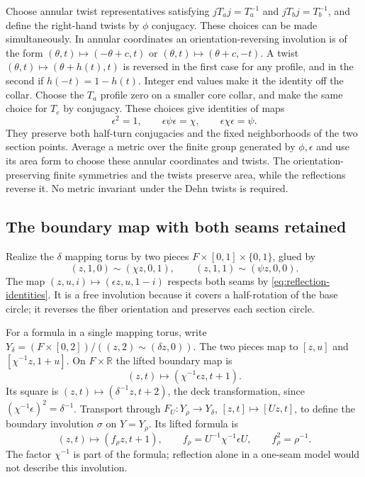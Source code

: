 \documentclass[11pt]{amsart}
\theoremstyle{definition}
\theoremstyle{remark}
\begin{document}
Choose annular twist representatives satisfying
$jT_aj=T_a^{-1}$ and $jT_bj=T_b^{-1}$, and define the right-hand
twists by $\phi$ conjugacy. These choices can be made simultaneously.
In annular coordinates an orientation-reversing involution is of the
form $(\theta,t)\mapsto(-\theta+c,t)$ or
$(\theta,t)\mapsto(\theta+c,-t)$. A twist
$(\theta,t)\mapsto(\theta+h(t),t)$ is reversed in the first case
for any profile, and in the second if $h(-t)=1-h(t)$. Integer end
values make it the identity off the collar. Choose the $T_a$ profile
zero on a smaller core collar, and make the same choice for $T_e$
by conjugacy. These choices give identities of maps
\begin{equation}\label{eq:reflection-identities}
 \epsilon^2=1,\qquad \epsilon\psi\epsilon=\chi,
 \qquad \epsilon\chi\epsilon=\psi.
\end{equation}
They preserve both half-turn conjugacies and the fixed neighborhoods
of the two section points. Average a metric over the finite group
generated by $\phi,\epsilon$ and use its area form to choose these
annular coordinates and twists. The orientation-preserving finite
symmetries and the twists preserve area, while the reflections reverse
it. No metric invariant under the Dehn twists is required.

\subsection{The boundary map with both seams retained}
Realize the $\delta$ mapping torus by two pieces
$F\times[0,1]\times\{0,1\}$, glued by
\[
 (z,1,0)\sim(\chi z,0,1),\qquad
 (z,1,1)\sim(\psi z,0,0).
\]
The map $(z,u,i)\mapsto(\epsilon z,u,1-i)$ respects both seams
by \eqref{eq:reflection-identities}. It is a free involution because
it covers a half-rotation of the base circle; it reverses the fiber
orientation and preserves each section circle.

For a formula in a single mapping torus, write
$Y_\delta=(F\times[0,2])/((z,2)\sim(\delta z,0))$.
The two pieces map to $[z,u]$ and $[\chi^{-1}z,1+u]$.
On $F\times\mathbb R$ the lifted boundary map is
\[
                  (z,t)\longmapsto(\chi^{-1}\epsilon z,t+1).
\]
Its square is $(z,t)\mapsto(\delta^{-1}z,t+2)$, the deck
transformation, since $(\chi^{-1}\epsilon)^2=\delta^{-1}$.
Transport through $F_U:Y_\rho\to Y_\delta$, $[z,t]\mapsto[Uz,t]$,
to define the boundary involution $\sigma$ on $Y=Y_\rho$.
Its lifted formula is
\begin{equation}\label{eq:sigma}
 (z,t)\longmapsto(f_\rho z,t+1),\qquad
 f_\rho=U^{-1}\chi^{-1}\epsilon U,\qquad f_\rho^2=\rho^{-1}.
\end{equation}
The factor $\chi^{-1}$ is part of the formula; reflection alone in
a one-seam model would not describe this involution.
\end{document}
